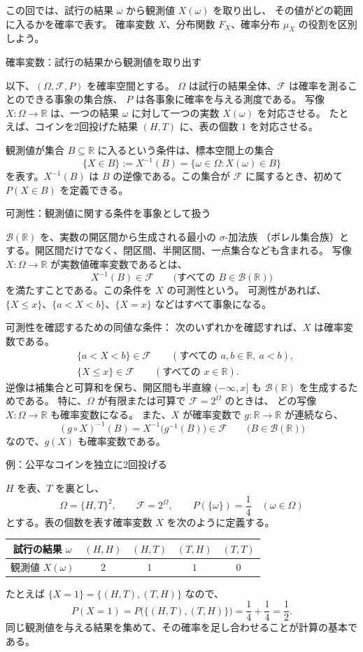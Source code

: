 \documentclass[a4paper,10pt,pdflatex,ja=standard,jafont=ipaex-type1,
  magstyle=real,scale=1]{bxjsarticle}
\newcommand{\topic}[1]{\par\vspace{5pt}
  {\large\sffamily\mdseries\color{accent}#1}\par\vspace{2pt}}
\newcommand{\keybox}[1]{\par\vspace{3pt}\begingroup
  \setlength{\fboxsep}{5pt}
  \colorbox{soft}{\parbox{\dimexpr\linewidth-2\fboxsep\relax}{#1}}%
  \endgroup\par\vspace{2pt}}
\newcommand{\examplelabel}[1]{{\sffamily\mdseries\color{ink}#1}}
\newcommand{\F}{\mathcal F}
\newcommand{\R}{\mathbb R}
\begin{document}
\keybox{この回では、試行の結果 $\omega$ から観測値 $X(\omega)$ を取り出し、
その値がどの範囲に入るかを確率で表す。
確率変数 $X$、分布関数 $F_X$、確率分布 $\mu_X$ の役割を区別しよう。}

\topic{確率変数：試行の結果から観測値を取り出す}
以下、$(\Omega,\F,P)$ を確率空間とする。
$\Omega$ は試行の結果全体、$\F$ は確率を測ることのできる事象の集合族、
$P$ は各事象に確率を与える測度である。
写像 $X:\Omega\to\R$ は、一つの結果 $\omega$ に対して一つの実数 $X(\omega)$ を対応させる。
たとえば、コインを2回投げた結果 $(H,T)$ に、表の個数 $1$ を対応させる。

観測値が集合 $B\subseteq\R$ に入るという条件は、標本空間上の集合
$$
  \{X\in B\}:=X^{-1}(B)
  =\{\omega\in\Omega:X(\omega)\in B\}
$$
を表す。$X^{-1}(B)$ は $B$ の逆像である。この集合が $\F$ に属するとき、初めて $P(X\in B)$ を定義できる。

\topic{可測性：観測値に関する条件を事象として扱う}
$\mathcal B(\R)$ を、実数の開区間から生成される最小の $\sigma$-加法族
（ボレル集合族）とする。開区間だけでなく、閉区間、半開区間、一点集合なども含まれる。
写像 $X:\Omega\to\R$ が実数値確率変数であるとは、
$$
  X^{-1}(B)\in\F\qquad\bigl(\text{すべての }B\in\mathcal B(\R)\bigr)
$$
を満たすことである。この条件を $X$ の可測性という。
可測性があれば、$\{X\le x\}$、$\{a<X<b\}$、$\{X=x\}$ などはすべて事象になる。

\examplelabel{可測性を確認するための同値な条件：}
次のいずれかを確認すれば、$X$ は確率変数である。
$$
  \begin{aligned}
    &\{a<X<b\}\in\F\qquad(\text{すべての }a,b\in\R,\ a<b),\\
    &\{X\le x\}\in\F\qquad(\text{すべての }x\in\R).
  \end{aligned}
$$
逆像は補集合と可算和を保ち、開区間も半直線 $(-\infty,x]$ も
$\mathcal B(\R)$ を生成するためである。
特に、$\Omega$ が有限または可算で $\F=2^\Omega$ のときは、
どの写像 $X:\Omega\to\R$ も確率変数になる。
また、$X$ が確率変数で $g:\R\to\R$ が連続なら、
$$
  (g\circ X)^{-1}(B)=X^{-1}\bigl(g^{-1}(B)\bigr)\in\F
  \qquad\bigl(B\in\mathcal B(\R)\bigr)
$$
なので、$g(X)$ も確率変数である。

\topic{例：公平なコインを独立に2回投げる}
$H$ を表、$T$ を裏とし、
$$
  \Omega=\{H,T\}^2,\qquad \F=2^\Omega,\qquad
  P(\{\omega\})=\frac14\quad(\omega\in\Omega)
$$
とする。表の個数を表す確率変数 $X$ を次のように定義する。
\begin{center}
\begin{tabular}{@{}c c c c c@{}}
\toprule
試行の結果 $\omega$ & $(H,H)$ & $(H,T)$ & $(T,H)$ & $(T,T)$ \\
\midrule
観測値 $X(\omega)$ & $2$ & $1$ & $1$ & $0$ \\
\bottomrule
\end{tabular}
\end{center}
たとえば $\{X=1\}=\{(H,T),(T,H)\}$ なので、
$$
  P(X=1)=P\bigl(\{(H,T),(T,H)\}\bigr)=\frac14+\frac14=\frac12.
$$
同じ観測値を与える結果を集めて、その確率を足し合わせることが計算の基本である。
\end{document}
